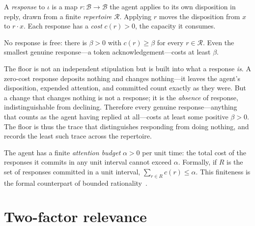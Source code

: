 \documentclass[11pt,twocolumn,a4paper]{article}
\newcommand{\Beh}{\mathcal{B}}       %
\newcommand{\Int}{\iota}             %
\newcommand{\resp}{r}                %
\newcommand{\Resp}{\mathcal{R}}      %
\newcommand{\floorc}{\beta}          %
\newcommand{\att}{\alpha}            %
\newcommand{\cost}{c}                %
\begin{document}
\begin{definition}
\label{def:response}
A \emph{response} to $\Int$ is a map $\resp:\Beh\to\Beh$ the agent applies
to its own disposition in reply, drawn from a finite \emph{repertoire}
$\Resp$. Applying $\resp$ moves the disposition from $x$ to
$\resp\!\cdot x$. Each response has a \emph{cost} $\cost(\resp)>0$,
the capacity it consumes.
\end{definition}

\begin{axiom}
\label{ax:floor}
No response is free: there is $\floorc>0$ with $\cost(\resp)\ge\floorc$ for
every $\resp\in\Resp$. Even the smallest genuine response---a token
acknowledgement---costs at least $\floorc$.
\end{axiom}

\begin{remark}
\label{rem:floor-earned}
The floor is not an independent stipulation but is built into what a
response \emph{is}. A zero-cost response deposits nothing and changes
nothing---it leaves the agent's disposition, expended attention, and
committed count exactly as they were. But a change that changes nothing is
not a response; it is the \emph{absence} of response, indistinguishable from
declining. Therefore every genuine response---anything that counts as the
agent having replied at all---costs at least some positive $\floorc>0$. The
floor is thus the trace that distinguishes responding from doing nothing,
and  records the least such trace across the repertoire.
\end{remark}

\begin{axiom}
\label{ax:attention}
The agent has a finite \emph{attention budget} $\att>0$ per unit time: the
total cost of the responses it commits in any unit interval cannot exceed
$\att$. Formally, if $R$ is the set of responses committed in a unit
interval, $\sum_{\resp\in R}\cost(\resp)\le\att$. This finiteness is the
formal counterpart of bounded rationality~\cite{simon1955}.
\end{axiom}

\section{Two-factor relevance}
\label{sec:relevance}
\end{document}
